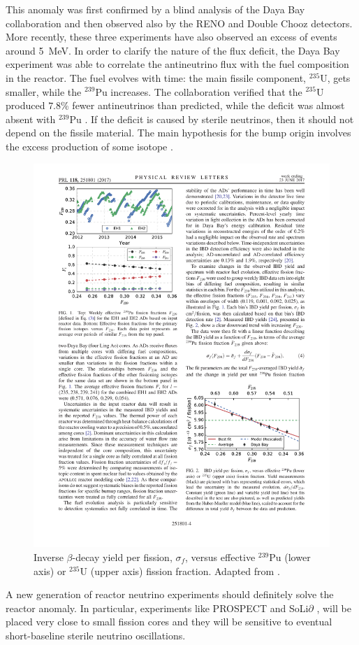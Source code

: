 \begin{description}
    This anomaly was first confirmed by a blind analysis of the Daya Bay collaboration \cite{An:2015nua} and then observed also by the RENO and Double Chooz detectors. More recently, these three experiments have also observed an excess of events around 5~MeV. 
    In order to clarify the nature of the flux deficit, the Daya Bay experiment was able to correlate the antineutrino flux with the fuel composition in the reactor. The fuel evolves with time: the main fissile component, $^{235}$U, gets smaller, while the $^{239}$Pu increases. The collaboration verified that the $^{235}$U produced $7.8$\% fewer antineutrinos than predicted, while the deficit was almost absent with $^{239}$Pu \cite{An:2017osx}. If the deficit is caused by sterile neutrinos, then it should not depend on the fissile material. The main hypothesis for the bump origin involves the excess production of some isotope \cite{Fallot:2017php}. 
    
    \begin{figure}[htbp]
      \centering
      \captionsetup{margin=1.3cm}
      \includegraphics[width=0.75\linewidth]{figures/dayabay.pdf}
      \caption{Inverse $\beta$-decay yield per fission, $\sigma_f$, versus effective $^{239}$Pu (lower axis) or $^{235}$U (upper axis) fission fraction. Adapted from \cite{An:2017osx}.}
    \label{fig:dayabay}
    \end{figure}
    
    A new generation of reactor neutrino experiments should definitely solve the reactor anomaly. In particular, experiments like PROSPECT \cite{Ashenfelter:2015uxt} and SoLi$\partial$ \cite{Abreu:2017bpe}, will be placed very close to small fission cores and they will be sensitive to eventual short-baseline sterile neutrino oscillations.
\end{description} 


